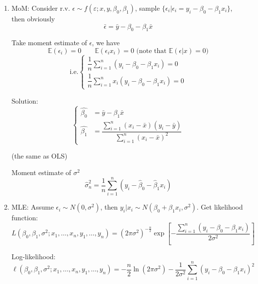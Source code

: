 \begin{enumerate}
    \item MoM: Consider r.v. $\epsilon\sim f(\varepsilon;x,y,\beta_0,\beta_1)$, sample $\{\epsilon_i|\epsilon_i=y_i-\beta_0-\beta_1x_i\}$, then obviously
        \begin{equation}\bar{\epsilon}=\bar{y}-\beta_0-\beta_1\bar{x}\end{equation}

        Take moment estimate of $\epsilon$, we have 
        \begin{equation}\mathbb{E}(\epsilon_i)=0\qquad \mathbb{E}(\epsilon_i x_i)=0\text{ (note that }\mathbb{E}(\epsilon|x)=0)\end{equation}
        \begin{equation}\text{i.e.}\begin{cases}
            
            \dfrac{1}{n}\sum_{i=1}^n(y_i-\beta_0-\beta_1x_i)=0\\
            \dfrac{1}{n}\sum_{i=1}^nx_i(y_i-\beta_0-\beta_1x_i)=0
        \end{cases}\end{equation}

        Solution:
        \begin{equation}\begin{cases}
            \hat{\beta_0}&=\bar{y}-\beta_1\bar{x}\\
            \hat{\beta_1}&=\dfrac{\sum_{i=1}^n(x_i-\bar{x})(y_i-\bar{y})}{\sum_{i=1}^n(x_i-\bar{x})^2}
        \end{cases}\end{equation}

        (the same as OLS)

        Moment estimate of $\sigma^2$
        \begin{equation}\hat{\sigma}^2_n=\frac{1}{n}\sum_{i=1}^n(y_i-\hat{\beta}_0-\hat{\beta}_1x_i)\end{equation}

    \item MLE: Assume $\epsilon_i\sim N(0,\sigma^2)$, then $y_i|x_i\sim N(\beta_0+\beta_1x_i,\sigma^2)$. Get likelihood function:
        \begin{equation}
            L(\beta_0,\beta_1,\sigma^2;x_1,\ldots,x_n,y_1,\ldots,y_n)=(2\pi\sigma^2)^{-\frac{n}{2}}\exp\left[-\frac{\sum_{i=1}^n(y_i-\beta_0-\beta_1x_i)}{2\sigma^2}\right]  
        \end{equation}

    Log-likelihood:
    \begin{equation}
        \ell(\beta _0,\beta _1,\sigma ^2;x_1,\ldots,x_n,y_1,\ldots,y_n)=-\dfrac{n}{2} \ln(2\pi\sigma ^2)-\dfrac{1}{2\sigma ^2}\sum_{i=1}^n(y_i-\beta _0-\beta _1x_i)^2
    \end{equation}


\end{enumerate}

